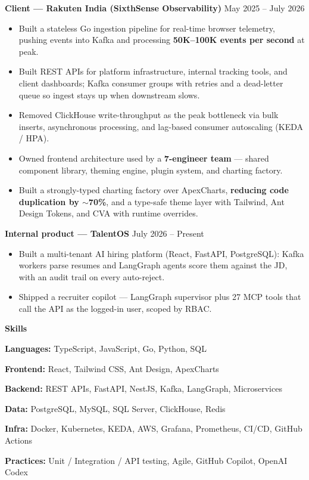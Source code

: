 \documentclass[10pt]{article}
\newcommand{\sectiontitle}[1]{%
  \par\vspace{8pt}%
  \noindent\textbf{\large #1}\par
  \vspace{-2pt}\noindent\hrulefill\par
  \vspace{4pt}%
}
\newcommand{\client}[2]{%
  \par\vspace{8pt}%
  \noindent\textbf{Client --- #1} \hfill #2\par
  \vspace{3pt}%
}
\newcommand{\product}[2]{%
  \par\vspace{8pt}%
  \noindent\textbf{Internal product --- #1} \hfill #2\par
  \vspace{3pt}%
}
\begin{document}
\client{Rakuten India (SixthSense Observability)}{May 2025 -- July 2026}
\begin{itemize}
  \item Built a stateless Go ingestion pipeline for real-time browser telemetry, pushing events into Kafka and processing \textbf{50K--100K events per second} at peak.
  \item Built REST APIs for platform infrastructure, internal tracking tools, and client dashboards; Kafka consumer groups with retries and a dead-letter queue so ingest stays up when downstream slows.
  \item Removed ClickHouse write-throughput as the peak bottleneck via bulk inserts, asynchronous processing, and lag-based consumer autoscaling (KEDA / HPA).
  \item Owned frontend architecture used by a \textbf{7-engineer team} --- shared component library, theming engine, plugin system, and charting factory.
  \item Built a strongly-typed charting factory over ApexCharts, \textbf{reducing code duplication by $\sim$70\%}, and a type-safe theme layer with Tailwind, Ant Design Tokens, and CVA with runtime overrides.
\end{itemize}

\product{TalentOS}{July 2026 -- Present}
\begin{itemize}
  \item Built a multi-tenant AI hiring platform (React, FastAPI, PostgreSQL): Kafka workers parse resumes and LangGraph agents score them against the JD, with an audit trail on every auto-reject.
  \item Shipped a recruiter copilot --- LangGraph supervisor plus 27 MCP tools that call the API as the logged-in user, scoped by RBAC.
\end{itemize}

\sectiontitle{Skills}

{\setlength{\parskip}{2.5pt}
\noindent\textbf{Languages:} TypeScript, JavaScript, Go, Python, SQL\par
\noindent\textbf{Frontend:} React, Tailwind CSS, Ant Design, ApexCharts\par
\noindent\textbf{Backend:} REST APIs, FastAPI, NestJS, Kafka, LangGraph, Microservices\par
\noindent\textbf{Data:} PostgreSQL, MySQL, SQL Server, ClickHouse, Redis\par
\noindent\textbf{Infra:} Docker, Kubernetes, KEDA, AWS, Grafana, Prometheus, CI/CD, GitHub Actions\par
\noindent\textbf{Practices:} Unit / Integration / API testing, Agile, GitHub Copilot, OpenAI Codex\par
}
\end{document}
